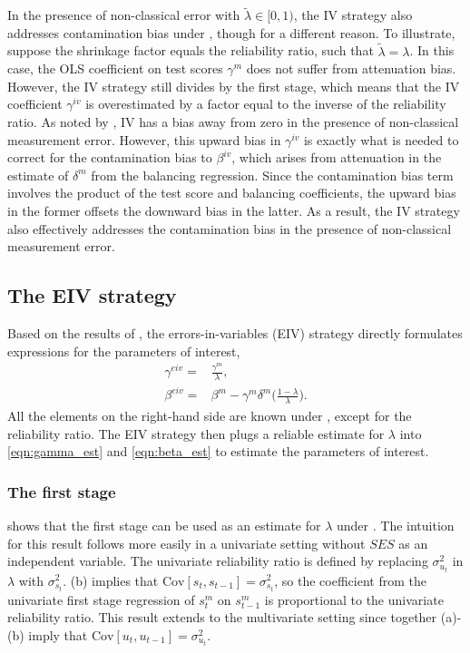 In the presence of non-classical error with $\widetilde{\lambda}\in[0,1)$, the IV strategy also addresses contamination bias under , though for a different reason. To illustrate, suppose the shrinkage factor equals the reliability ratio, such that $\widetilde{\lambda}=\lambda$. In this case, the OLS coefficient on test scores $\gamma^m$ does not suffer from attenuation bias. However, the IV strategy still divides by the first stage, which means that the IV coefficient $\gamma^{iv}$ is overestimated by a factor equal to the inverse of the reliability ratio. As noted by \cite{hyslop2001bias}, IV has a bias away from zero in the presence of non-classical measurement error.
%
However, this upward bias in $\gamma^{iv}$ is exactly what is needed to correct for the contamination bias to $\beta^{iv}$, which arises from attenuation in the estimate of $\delta^m$ from the balancing regression. Since the contamination bias term involves the product of the test score and balancing coefficients, the upward bias in the former offsets the downward bias in the latter. As a result, the IV strategy also effectively addresses the contamination bias in the presence of non-classical measurement error.

\subsection{The EIV strategy}

Based on the results of , the errors-in-variables (EIV) strategy directly formulates expressions for the parameters of interest,
\begin{align}\label{eqn:gamma_est}
    \gamma^{eiv}=&\frac{\gamma^m}{\lambda}, \\  
    \label{eqn:beta_est}
    \beta^{eiv}=&\beta^m-\gamma^m \delta^m \Bigg(\frac{1-\lambda}{\lambda}\Bigg).
\end{align}
All the elements on the right-hand side are known under , except for the reliability ratio. 
The EIV strategy then plugs a reliable estimate for $\lambda$ into \eqref{eqn:gamma_est} and \eqref{eqn:beta_est} to estimate the parameters of interest. 

\subsubsection{The first stage}

 shows that the first stage can be used as an estimate for $\lambda$ under . The intuition for this result follows more easily in a  univariate setting without $SES$ as an independent variable. The univariate reliability ratio is defined by replacing $\sigma_{u_{t}}^2$ in $\lambda$ with $\sigma_{s_{t}}^2$. (b) implies that $\mathrm{Cov}[s_t,s_{t-1}]=\sigma_{s_{t}}^2$, so the coefficient from the univariate first stage regression of $s^m_{t}$ on $s^m_{t-1}$ is proportional to the univariate reliability ratio. This result extends to the multivariate setting since together (a)-(b) imply that $\mathrm{Cov}[u_t,u_{t-1}]=\sigma_{u_{t}}^2$.

